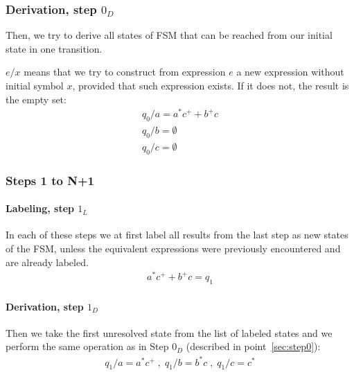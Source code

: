 \documentclass{article}
\begin{document}
\subsubsection*{Derivation, step $0_D$}
Then, we try to derive all states of FSM that can be reached from our initial state in one
transition.

$e / x$ means that we try to construct from expression $e$ a new  expression without initial symbol
$x$, provided that such expression exists. If it does not, the result is the empty set:
\begin{gather*}
q_0 / a = a^*c^+ + b^+c \\
q_0 / b = \emptyset \\
q_0 / c = \emptyset
\end{gather*}

\subsubsection{Steps 1 to N+1}

\paragraph{Labeling, step $1_L$}
In each of these steps we at first label all results from the last step as new states of the FSM,
unless the equivalent expressions were previously encountered and are already labeled.
\begin{gather*}
a^*c^+ + b^+c = q_1
\end{gather*}

\paragraph{Derivation, step $1_D$}
Then we take the first unresolved state from the list of labeled states and we perform the same
operation as in Step $0_D$ (described in point~\ref{sec:step0}):
\begin{gather*}
q_1 / a = a^*c^+ \; , \;
q_1 / b = b^*c \; , \;
q_1 / c = c^*
\end{gather*}
\end{document}
